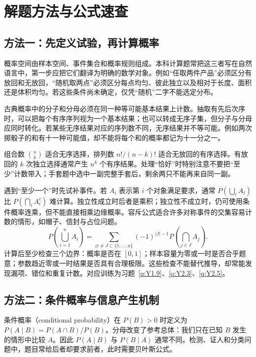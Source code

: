 \documentclass[UTF8,12pt,a4paper,fontset=fandol]{ctexbook}
\begin{document}
\clearpage
\chapter{解题方法与公式速查}
\section*{方法一：先定义试验，再计算概率}
概率空间由样本空间、事件集合和概率规则组成。本科计算题常把这三者写在自然语言中，第一步应把它们翻译为明确的数学对象。例如“任取两件产品”必须区分有放回和无放回，“随机取两点”必须区分每点均匀、彼此独立以及相对于长度、面积还是体积均匀。若这些条件尚未确定，仅凭“随机”二字不能选定分布。

古典概率中的分子和分母必须在同一种等可能基本结果上计数。抽取有先后次序时，可以把每个有序序列视为一个基本结果；也可以转成无序子集，但分子与分母应同时转化。若某些无序结果对应的序列数不同，无序结果并不等可能。例如两次掷骰子的和有十一种可能值，却不能将每个和的概率都记为十一分之一。

组合数 $\binom nk$ 适合无序选择，排列数 $n!/(n-k)!$ 适合无放回的有序选择。有放回的 $k$ 次独立选择通常产生 $n^k$ 个有序结果。处理“恰好”时特别注意不要把“至少”计数带入；手套题中选中一副完整手套后，剩余两只不能再来自同一副。

遇到“至少一个”时先试补事件。若 $A_i$ 表示第 $i$ 个对象满足要求，通常 $P(\bigcup_iA_i)$ 比 $P(\bigcap_iA_i^c)$ 难计算。独立性成立时后者是乘积；独立性不成立时，仍可使用条件概率连乘，但不能直接相乘边缘概率。容斥公式适合许多对称事件的交集容易计数的情形，如帽子、信封与占位问题。
\begin{equation*}
P\left(\bigcup_{i=1}^nA_i\right)
=\sum_{\varnothing\ne J\subset\{1,\ldots,n\}}(-1)^{|J|-1}P\left(\bigcap_{j\in J}A_j\right).
\end{equation*}
计算后至少检查三个边界：概率是否在 $[0,1]$；样本容量为零或一时是否合乎题意；参数趋近零或一时结果是否具有合理极限。这些检查不能替代推导，却常能发现漏项、错位和重复计数。对应训练为习题~\ref{q:Y1.9}、\ref{q:Y2.3}、\ref{q:Y2.5}。

\section*{方法二：条件概率与信息产生机制}
条件概率（conditional probability）在 $P(B)>0$ 时定义为 $P(A\mid B)=P(A\cap B)/P(B)$。分母改变了参考总体：我们只在已知 $B$ 发生的情形中比较 $A$。因此 $P(A\mid B)$ 与 $P(B\mid A)$ 通常不同。检测、证人和分类问题中，题目常给后者却要求前者，此时需要贝叶斯公式。
\end{document}
